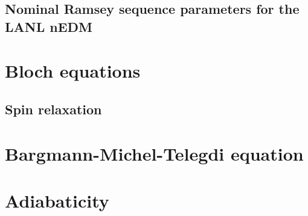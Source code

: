 


\subsection{Nominal Ramsey sequence parameters for the LANL nEDM}



\section{Bloch equations}\label{sec:bloch_equations}




\subsection{Spin relaxation}\label{sec:spin_relaxation}





\section{Bargmann-Michel-Telegdi equation}\label{sec:BMT_equations}



\section{Adiabaticity}\label{sec:adiabaticity}


